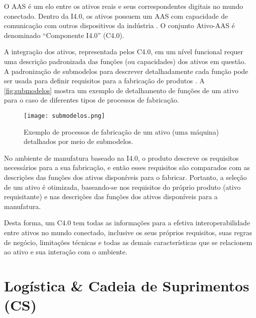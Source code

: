 O AAS é um elo entre os ativos reais e seus correspondentes digitais no mundo conectado. Dentro da I4.0, os ativos possuem um AAS com capacidade de comunicação com outros dispositivos da indústria \cite{bader2019aas}. O conjunto Ativo-AAS é denominado ``Componente I4.0'' (C4.0).



A integração dos ativos, representada pelos C4.0, em um nível funcional requer uma descrição padronizada das funções (ou capacidades) dos ativos em questão. A padronização de submodelos para descrever detalhadamente cada função pode ser usada para definir requisitos para a fabricação de produtos \cite{bedenbender2017aasexamples}. A \autoref{fig:submodelos} mostra um exemplo de detalhamento de funções de um ativo para o caso de diferentes tipos de processos de fabricação.

\begin{figure}[htb]
	\centering
	\texttt{[image: submodelos.png]}
	\caption{Exemplo de processos de fabricação de um ativo (uma máquina) detalhados por meio de submodelos.}
	\label{fig:submodelos}
\end{figure}

No ambiente de manufatura baseado na I4.0, o produto descreve os requisitos necessários para a sua fabricação, e então esses requisitos são comparados com as descrições das funções dos ativos disponíveis para o fabricar. Portanto, a seleção de um ativo é otimizada, baseando-se nos requisitos do próprio produto (ativo requisitante) e nas descrições das funções dos ativos disponíveis para a manufatura.

Desta forma, um C4.0 tem todas as informações para a efetiva interoperabilidade entre ativos no mundo conectado, inclusive os seus próprios requisitos, suas regras de negócio, limitações técnicas e todas as demais características que se relacionem ao ativo e sua interação com o ambiente.

\section{Logística \& Cadeia de Suprimentos (CS)}
\label{sec:logistica}

